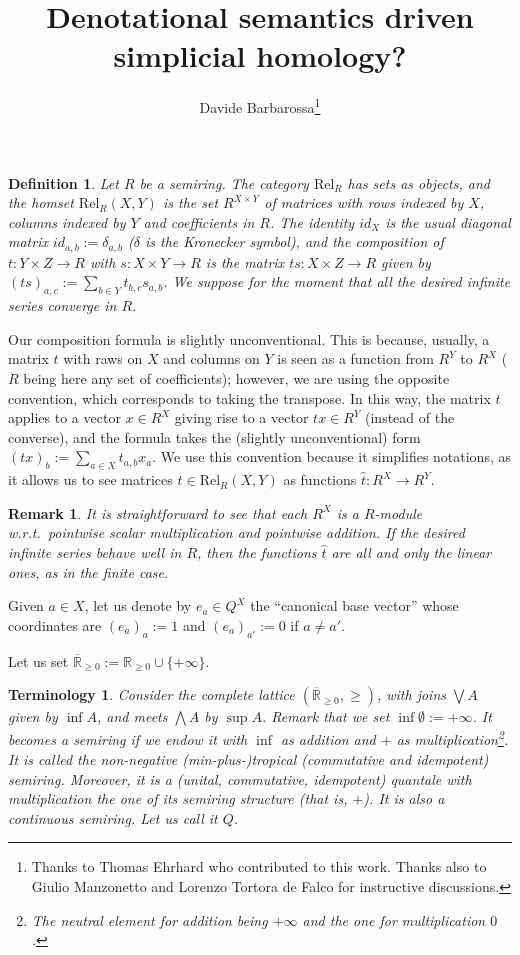 \documentclass[submission,copyright,creativecommons]{eptcs}
\title{Denotational semantics driven simplicial homology?}
\author{Davide Barbarossa\thanks{Thanks to Thomas Ehrhard who contributed to this work. Thanks also to Giulio Manzonetto and Lorenzo Tortora de Falco for instructive discussions.}
\institute{Dipartimento di Informatica: Scienza ed Ingegneria\\
Università di Bologna%
\\
Bologna, Italia}
\email{davide.barbarossa@unibo.it}
}
\newtheorem{Definition}[theorem]{Definition}
\newtheorem{Remark}[theorem]{Remark}
\newtheorem{Terminology}[theorem]{Terminology}
\newcommand{\R}{\mathbb{R}}
\newcommand{\set}[1]{\{#1\}}
\newcommand{\alarm}[1]{\color{red}#1\color{black}}
\begin{document}


\begin{Definition}
Let $R$ be a semiring.
The category $\mathrm{Rel}_R$ has sets as objects, and the homset $\mathrm{Rel}_R(X,Y)$ is the set $R^{X\times Y}$ of matrices with rows indexed by $X$, columns indexed by $Y$ and coefficients in $R$.
The identity $id_X$ is the usual diagonal matrix $id_{a,b}:=\delta_{a,b}$ ($\delta$ is the Kronecker symbol), and the composition of $t:Y\times Z\to R$ with $s:X\times Y\to R$ is the matrix $ts:X\times Z\to R$ given by $(ts)_{a,c}:=\sum\limits_{b\in Y} t_{b,c}s_{a,b}$.
We suppose for the moment that all the desired infinite series converge in $R$.
\end{Definition}

Our composition formula is slightly unconventional.
This is because, usually, a matrix $t$ with raws on $X$ and columns on $Y$ is seen as a function from $R^Y$ to $R^X$ ($R$ being here any set of coefficients);
however, we are using the opposite convention, which corresponds to taking the transpose.
In this way, the matrix $t$ applies to a vector $x\in R^X$ giving rise to a vector $tx\in R^Y$ (instead of the converse), and the formula takes the (slightly unconventional) form $(tx)_{b} := \sum\limits_{a\in X} t_{a,b}x_{a}$.
We use this convention because it simplifies notations, as it allows us to see matrices $t\in\mathrm{Rel}_R(X,Y)$ as functions $\hat{t}:R^X\to R^Y$.

\begin{Remark}
It is straightforward to see that each $R^X$ is a $R$-\emph{module} w.r.t.\ pointwise scalar multiplication and pointwise addition.
\alarm{If the desired infinite series behave well in $R$, then the functions $\hat{t}$ are all and only the linear ones, as in the finite case.}
\end{Remark}

Given $a\in X$, let us denote by $e_a\in Q^X$ the ``canonical base vector'' whose coordinates are $(e_a)_{a}:=1$ and $(e_a)_{a'}:=0$ if $a\neq a'$.

Let us set $\overline{\R}_{\geq 0}:=\R_{\geq 0}\cup\set{+\infty}$.

\begin{Terminology}
Consider the complete lattice $(\overline{\R}_{\geq 0},\geq)$, with joins $\bigvee A$ given by $\inf A$, and meets $\bigwedge A$ by $\sup A$.
Remark that we set $\inf \emptyset := +\infty$.
It becomes a semiring if we endow it with $\inf$ as addition and $+$ as multiplication\footnote{The neutral element for addition being $+\infty$ and the one for multiplication $0$.}.
It is called the \emph{non-negative (min-plus-)tropical (commutative and idempotent) semiring}.
Moreover, it is a (unital, commutative, idempotent) quantale with multiplication the one of its semiring structure (that is, $+$).
It is also a continuous semiring.
Let us call it $Q$.
\end{Terminology}
\end{document}
